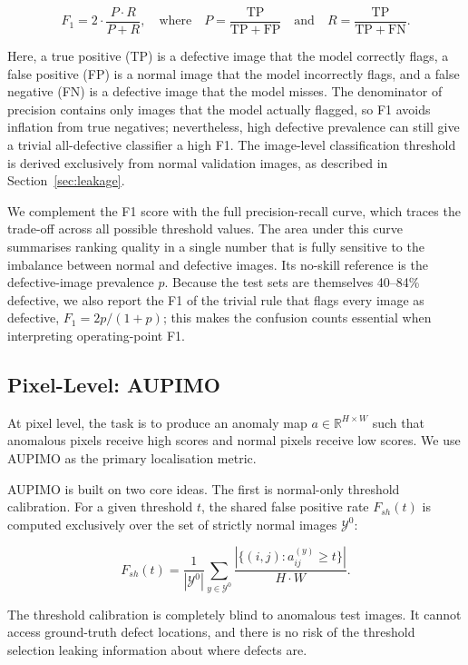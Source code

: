 \documentclass[11pt, a4paper]{article}
\begin{document}
\[
F_1 = 2 \cdot \frac{P \cdot R}{P + R}, \quad \text{where} \quad P = \frac{\mathrm{TP}}{\mathrm{TP} + \mathrm{FP}} \quad \text{and} \quad R = \frac{\mathrm{TP}}{\mathrm{TP} + \mathrm{FN}}.
\]

Here, a true positive (TP) is a defective image that the model correctly flags, a false positive (FP) is a normal image that the model incorrectly flags, and a false negative (FN) is a defective image that the model misses. The denominator of precision contains only images that the model actually flagged, so F1 avoids inflation from true negatives; nevertheless, high defective prevalence can still give a trivial all-defective classifier a high F1. The image-level classification threshold is derived exclusively from normal validation images, as described in Section~\ref{sec:leakage}.

We complement the F1 score with the full precision-recall curve, which traces the trade-off across all possible threshold values. The area under this curve summarises ranking quality in a single number that is fully sensitive to the imbalance between normal and defective images. Its no-skill reference is the defective-image prevalence $p$. Because the test sets are themselves 40--84\% defective, we also report the F1 of the trivial rule that flags every image as defective, $F_1=2p/(1+p)$; this makes the confusion counts essential when interpreting operating-point F1.

\subsection{Pixel-Level: AUPIMO}

At pixel level, the task is to produce an anomaly map $a \in \mathbb{R}^{H \times W}$ such that anomalous pixels receive high scores and normal pixels receive low scores. We use AUPIMO \cite{bertoldo2024aupimo} as the primary localisation metric.

AUPIMO is built on two core ideas. The first is normal-only threshold calibration. For a given threshold $t$, the shared false positive rate $F_{sh}(t)$ is computed exclusively over the set of strictly normal images $\mathcal{Y}^0$:

\[
F_{sh}(t) = \frac{1}{|\mathcal{Y}^0|} \sum_{y \in \mathcal{Y}^0} \frac{|\{(i,j) : a_{ij}^{(y)} \geq t\}|}{H \cdot W}.
\]

The threshold calibration is completely blind to anomalous test images. It cannot access ground-truth defect locations, and there is no risk of the threshold selection leaking information about where defects are.
\end{document}
